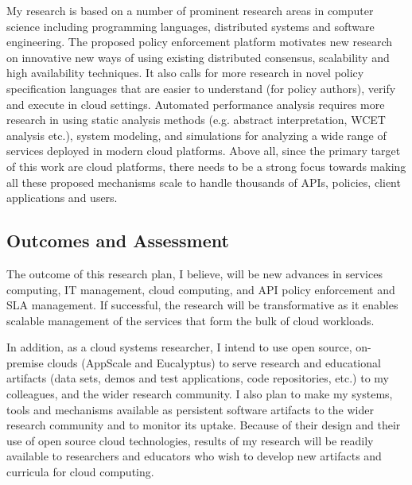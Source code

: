 My research is based on a number of prominent research areas in computer
science including programming languages, 
distributed systems and software engineering. The proposed policy enforcement
platform motivates new research on innovative new ways of using existing
distributed consensus, scalability and high availability techniques. It also calls for
more research in novel policy specification languages that
are easier to understand (for policy authors), verify and execute in cloud settings.
Automated performance analysis requires more research in using
static analysis methods (e.g. abstract interpretation, WCET analysis etc.), system modeling,
and simulations for analyzing a wide range of services deployed in modern cloud platforms.
Above all, since the primary target of this
work are cloud platforms, there needs to be a strong focus towards making all these 
proposed mechanisms scale to handle thousands of APIs, policies, client applications and users.

\subsection{Outcomes and Assessment}

The outcome of this research plan,
I believe, will be new advances in services computing, IT management, cloud
computing, and API policy enforcement and SLA management.
If successful, the research will be transformative as it
enables scalable management of the services that form the
bulk of cloud workloads.

In addition,
as a cloud systems researcher, I intend to use open source, on-premise clouds (AppScale
and Eucalyptus) to serve research and educational artifacts (data sets, demos and test applications, 
code repositories, etc.) to my colleagues, 
and the wider research community.  
I also plan to make my systems, tools and mechanisms available as persistent software artifacts to
the wider research community and to monitor its uptake.  Because of their design
and their use of open source cloud technologies, results of my research will be readily available
to researchers and educators who wish to develop new artifacts and curricula
for cloud computing. 